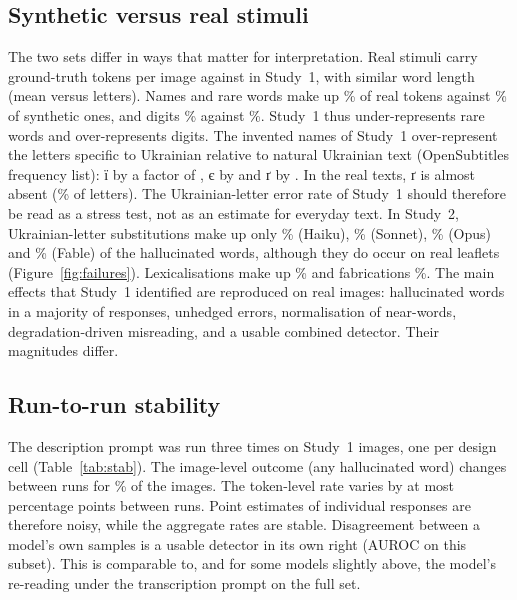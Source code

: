 \subsection{Synthetic versus real stimuli}\label{sec:setcompare}

The two sets differ in ways that matter for interpretation. Real stimuli carry \RealTokPerImg{} ground-truth tokens per image against \SynTokPerImg{} in Study~1, with similar word length (mean \RealTokLen{} versus \SynTokLen{} letters). Names and rare words make up \RealNameShare\% of real tokens against \SynNameShare\% of synthetic ones, and digits \RealNumShare\% against \SynNumShare\%. Study~1 thus under-represents rare words and over-represents digits. The invented names of Study~1 over-represent the letters specific to Ukrainian relative to natural Ukrainian text (OpenSubtitles frequency list): \foreignlanguage{ukrainian}{ї} by a factor of \OverYi, \foreignlanguage{ukrainian}{є} by \OverYe{} and \foreignlanguage{ukrainian}{ґ} by \OverGhe. In the real texts, \foreignlanguage{ukrainian}{ґ} is almost absent (\RealGheShare\% of letters). The Ukrainian-letter error rate of Study~1 should therefore be read as a stress test, not as an estimate for everyday text. In Study~2, Ukrainian-letter substitutions make up only \RealSubUaHaiku\% (Haiku), \RealSubUaSonnet\% (Sonnet), \RealSubUaOpus\% (Opus) and \RealSubUaFable\% (Fable) of the hallucinated words, although they do occur on real leaflets (Figure~\ref{fig:failures}). Lexicalisations make up \RealRangeSubLex\% and fabrications \RealRangeSubFab\%. The main effects that Study~1 identified are reproduced on real images: hallucinated words in a majority of responses, unhedged errors, normalisation of near-words, degradation-driven misreading, and a usable combined detector. Their magnitudes differ.

\subsection{Run-to-run stability}\label{sec:stability}

The description prompt was run three times on \StabN{} Study~1 images, one per design cell (Table~\ref{tab:stab}). The image-level outcome (any hallucinated word) changes between runs for \StabFlipRange\% of the images. The token-level rate varies by at most \StabSpreadMax{} percentage points between runs. Point estimates of individual responses are therefore noisy, while the aggregate rates are stable. Disagreement between a model's own samples is a usable detector in its own right (AUROC \StabDisAucRange{} on this subset). This is comparable to, and for some models slightly above, the model's re-reading under the transcription prompt on the full set.

